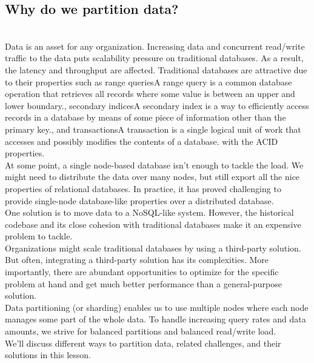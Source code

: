 

\subsection{Why do we partition data?}\label{OSNyl5V4NYhMzRkuW_x6N}
\\
Data is an asset for any organization. Increasing data and concurrent read/write traffic to the data puts scalability pressure on traditional databases. As a result, the latency and throughput are affected. Traditional databases are attractive due to their properties such as range queriesA range query is a common database operation that retrieves all records where some value is between an upper and lower boundary., secondary indicesA secondary index is a way to efficiently access records in a database by means of some piece of information other than the primary key., and transactionsA transaction is a single logical unit of work that accesses and possibly modifies the contents of a database. with the ACID properties.
\\
At some point, a single node-based database isn't enough to tackle the load. We might need to distribute the data over many nodes, but still export all the nice properties of relational databases. In practice, it has proved challenging to provide single-node database-like properties over a distributed database.
\\
One solution is to move data to a NoSQL-like system. However, the historical codebase and its close cohesion with traditional databases make it an expensive problem to tackle.
\\
Organizations might scale traditional databases by using a third-party solution. But often, integrating a third-party solution has its complexities. More importantly, there are abundant opportunities to optimize for the specific problem at hand and get much better performance than a general-purpose solution.
\\
Data partitioning (or sharding) enables us to use multiple nodes where each node manages some part of the whole data. To handle increasing query rates and data amounts, we strive for balanced partitions and balanced read/write load.
\\
We'll discuss different ways to partition data, related challenges, and their solutions in this lesson.

